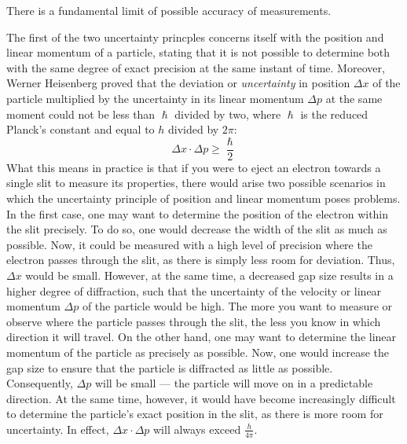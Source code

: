 \begin{displayquote}
	
	There is a fundamental limit of possible accuracy of measurements.	

\end{displayquote}


The first of the two uncertainty princples concerns itself with the position and linear momentum of a particle, stating that it is not possible to determine both with the same degree of exact precision at the same instant of time. Moreover, Werner Heisenberg proved that the deviation or \emph{uncertainty} in position $\Delta x$ of the particle multiplied by the uncertainty in its linear momentum $\Delta p$ at the same moment could not be less than $\hslash$ divided by two, where $\hslash$ is the reduced Planck's constant and equal to $h$ divided by $2 \pi$: $$\Delta x \cdot \Delta p \geq \frac{\hslash}{2}$$ What this means in practice is that if you were to eject an electron towards a single slit to measure its properties, there would arise two possible scenarios in which the uncertainty principle of position and linear momentum poses problems. In the first case, one may want to determine the position of the electron within the slit precisely. To do so, one would decrease the width of the slit as much as possible. Now, it could be measured with a high level of precision where the electron passes through the slit, as there is simply less room for deviation. Thus, $\Delta x$ would be small. However, at the same time, a decreased gap size results in a higher degree of diffraction, such that the uncertainty of the velocity or linear momentum $\Delta p$ of the particle would be high. The more you want to measure or observe where the particle passes through the slit, the less you know in which direction it will travel. On the other hand, one may want to determine the linear momentum of the particle as precisely as possible. Now, one would increase the gap size to ensure that the particle is diffracted as little as possible. Consequently, $\Delta p$ will be small --- the particle will move on in a predictable direction. At the same time, however, it would have become increasingly difficult to determine the particle's exact position in the slit, as there is more room for uncertainty. In effect, $\Delta x \cdot \Delta p$ will always exceed $\frac{h}{4 \pi}$.


